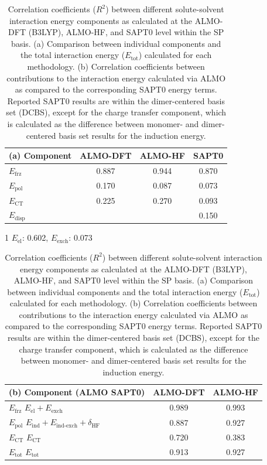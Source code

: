 \documentclass[%
  class = book,%
  crop = false,%
  float = true,%
  multi = true,%
  preview = false,%
]{standalone}
\begin{document}
\begin{table}
  \centering%
  \caption[Correlation between ALMO and SAPT0 terms]{Correlation coefficients (\(R^2\)) between different solute-solvent interaction energy components as calculated at the ALMO-DFT (B3LYP), ALMO-HF, and SAPT0 level within the SP basis. (a) Comparison between individual components and the total interaction energy (\(E_{\text{tot}}\)) calculated for each methodology. (b) Correlation coefficients between contributions to the \cotil{} interaction energy calculated via ALMO as compared to the corresponding SAPT0 energy terms. Reported SAPT0 results are within the dimer-centered basis set (DCBS), except for the charge transfer component, which is calculated as the difference between monomer- and dimer-centered basis set results for the induction energy.}
  \label{paper_02:tab:7}
  \begin{threeparttable}
    \begin{tabular}{lccc}
      \toprule
      (a) Component & ALMO-DFT & ALMO-HF & SAPT0 \\
      \midrule
      \(E_{\text{frz}}\) & 0.887 & 0.944 & 0.870\tnote{1} \\
      \(E_{\text{pol}}\) & 0.170 & 0.087 & 0.073 \\
      \(E_{\text{CT}}\) & 0.225 & 0.270 & 0.093 \\
      \(E_{\text{disp}}\) & \textemdash{} & \textemdash{} & 0.150 \\
      \bottomrule
    \end{tabular}
    \begin{tablenotes}
    \item[1] \(E_{\text{el}}\): 0.602, \(E_{\text{exch}}\): 0.073
    \end{tablenotes}
  \end{threeparttable}
  \begin{tabular}{lcc}
    \toprule
    (b) Component (ALMO \textemdash{} SAPT0) & ALMO-DFT & ALMO-HF \\
    \midrule
    \(E_{\text{frz}}\) \textemdash{} \(E_{\text{el}} + E_{\text{exch}}\) & 0.989 & 0.993 \\
    \(E_{\text{pol}}\) \textemdash{} \(E_{\text{ind}} + E_{\text{ind-exch}} + \delta_{\text{HF}}\) & 0.887 & 0.927 \\
    \(E_{\text{CT}}\) \textemdash{} \(E_{\text{CT}}\) & 0.720 & 0.383 \\
    \(E_{\text{tot}}\) \textemdash{} \(E_{\text{tot}}\) & 0.913 & 0.927 \\
    \bottomrule
  \end{tabular}
\end{table}
\end{document}
